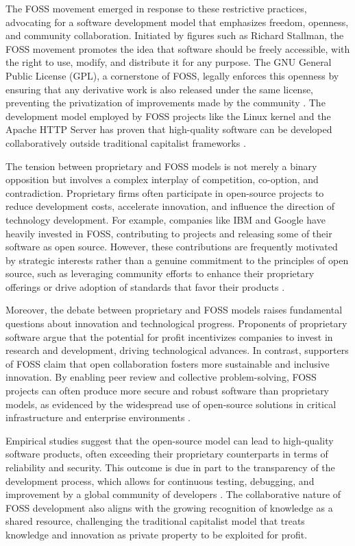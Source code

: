 \begin{refsection}
The FOSS movement emerged in response to these restrictive practices, advocating for a software development model that emphasizes freedom, openness, and community collaboration. Initiated by figures such as Richard Stallman, the FOSS movement promotes the idea that software should be freely accessible, with the right to use, modify, and distribute it for any purpose. The GNU General Public License (GPL), a cornerstone of FOSS, legally enforces this openness by ensuring that any derivative work is also released under the same license, preventing the privatization of improvements made by the community \cite[pp.~85-90]{stallman2010}. The development model employed by FOSS projects like the Linux kernel and the Apache HTTP Server has proven that high-quality software can be developed collaboratively outside traditional capitalist frameworks \cite[pp.~100-105]{raymond2022}.

The tension between proprietary and FOSS models is not merely a binary opposition but involves a complex interplay of competition, co-option, and contradiction. Proprietary firms often participate in open-source projects to reduce development costs, accelerate innovation, and influence the direction of technology development. For example, companies like IBM and Google have heavily invested in FOSS, contributing to projects and releasing some of their software as open source. However, these contributions are frequently motivated by strategic interests rather than a genuine commitment to the principles of open source, such as leveraging community efforts to enhance their proprietary offerings or drive adoption of standards that favor their products \cite[pp.~31-37]{benkler2010}.

Moreover, the debate between proprietary and FOSS models raises fundamental questions about innovation and technological progress. Proponents of proprietary software argue that the potential for profit incentivizes companies to invest in research and development, driving technological advances. In contrast, supporters of FOSS claim that open collaboration fosters more sustainable and inclusive innovation. By enabling peer review and collective problem-solving, FOSS projects can often produce more secure and robust software than proprietary models, as evidenced by the widespread use of open-source solutions in critical infrastructure and enterprise environments \cite[pp.~200-205]{vonhippel2006}.

Empirical studies suggest that the open-source model can lead to high-quality software products, often exceeding their proprietary counterparts in terms of reliability and security. This outcome is due in part to the transparency of the development process, which allows for continuous testing, debugging, and improvement by a global community of developers \cite[pp.~115-120]{lerner2000}. The collaborative nature of FOSS development also aligns with the growing recognition of knowledge as a shared resource, challenging the traditional capitalist model that treats knowledge and innovation as private property to be exploited for profit.


\end{refsection}
